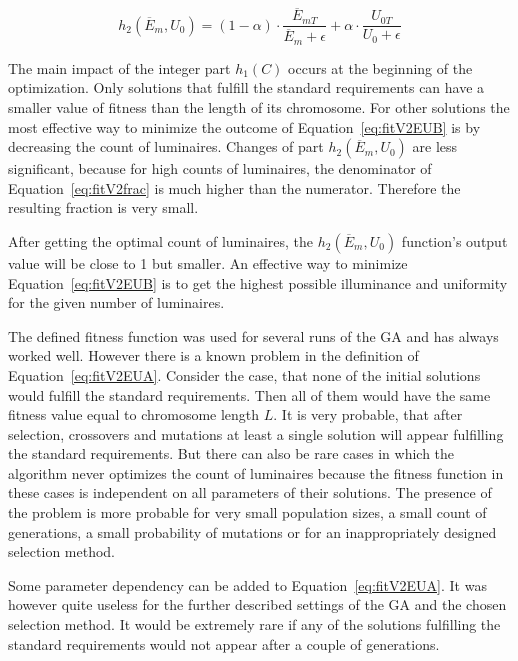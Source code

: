 \begin{equation}
\label{eq:fitV2frac}
	h_2\left(\overline{E}_{m}, U_0\right)= \left( 1 - \alpha\right)\cdot\frac{\overline{E}_{mT}}{\overline{E}_{m}+\epsilon} + \alpha\cdot\frac{U_{0T}}{U_0 + \epsilon}
\end{equation}

The main impact of the integer part $h_1\left(C\right)$ occurs at the beginning of the optimization. Only solutions that fulfill the standard requirements can have a smaller value of fitness than the length of its chromosome. For other solutions the most effective way to minimize the outcome of Equation~\ref{eq:fitV2EUB} is by decreasing the count of luminaires. Changes of part $h_2\left(\overline{E}_{m}, U_0\right)$ are less significant, because for high counts of luminaires, the denominator of Equation~\ref{eq:fitV2frac} is much higher than the numerator. Therefore the resulting fraction is very small.

After getting the optimal count of luminaires, the $h_2\left(\overline{E}_{m}, U_0\right)$ function's output value will be close to 1 but smaller. An effective way to minimize Equation~\ref{eq:fitV2EUB} is to get the highest possible illuminance and uniformity for the given number of luminaires.

The defined fitness function was used for several runs of the GA and has always worked well. However there is a known problem in the definition of Equation~\ref{eq:fitV2EUA}. Consider the case, that none of the initial solutions would fulfill the standard requirements. Then all of them would have the same fitness value equal to chromosome length $L$. It is very probable, that after selection, crossovers and mutations at least a single solution will appear fulfilling the standard requirements. But there can also be rare cases in which the algorithm never optimizes the count of luminaires because the fitness function in these cases is independent on all parameters of their solutions. The presence of the problem is more probable for very small population sizes, a small count of generations, a small probability of mutations or for an inappropriately designed selection method.

Some parameter dependency can be added to Equation~\ref{eq:fitV2EUA}. It was however quite useless for the further described settings of the GA and the chosen selection method. It would be extremely rare if any of the solutions fulfilling the standard requirements would not appear after a couple of generations.
